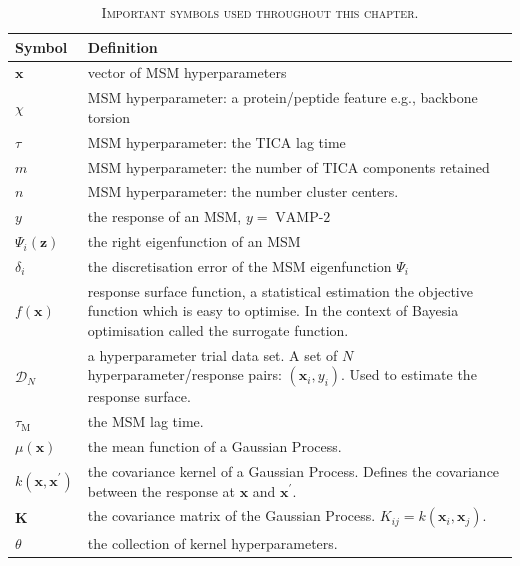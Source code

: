 \begin{table}
    \centering
    \caption[Important symbols]{\textsc{Important symbols used throughout this chapter}.}
    \begin{tabularx}{0.9\textwidth}{ l >{\raggedright\arraybackslash}X  } 
    \hline
        \textbf{Symbol}  &  \textbf{Definition} \\
        \hline\hline
        $\mathbf{x}$ & vector of MSM hyperparameters \\
        $\chi$ & MSM hyperparameter: a protein/peptide feature e.g., backbone torsion \\
        $\tau$ & MSM hyperparameter: the TICA lag time \\
        $m$ & MSM hyperparameter: the number of TICA components retained \\
        $n$ & MSM hyperparameter: the number cluster centers. \\
        $y$ & the response of an MSM, $y =\operatorname{VAMP-2}$ \\
        $\Psi_i(\mathbf{z})$ & the right eigenfunction of an MSM \\
        $\delta_i$ & the discretisation error of the MSM eigenfunction $\Psi_{i}$ \\
        $f(\mathbf{x})$ & response surface function, a statistical estimation the objective function 
                          which is easy to optimise. In the context of Bayesia optimisation called the 
                          surrogate function. \\
        $\mathcal{D}_{N}$ & a hyperparameter trial data set. A set of $N$ hyperparameter/response pairs: $(\mathbf{x}_{i}, y_{i})$. Used to estimate the response surface. \\
        $\tau_{\mathrm{M}}$ & the MSM lag time.  \\
        $\mu(\mathbf{x})$ & the mean function of a Gaussian Process. \\
        $k(\mathbf{x}, \mathbf{x}^{\prime})$ & the covariance kernel of a Gaussian Process. Defines the covariance between the response at $\mathbf{x}$ and $\mathbf{x}^{\prime}$. \\
        $\mathbf{K}$ & the covariance matrix of the Gaussian Process. $K_{ij} =k(\mathbf{x}_{i}, \mathbf{x}_{j})$. \\
        $\theta$ & the collection of kernel hyperparameters. \\

\end{tabularx}
\end{table}
